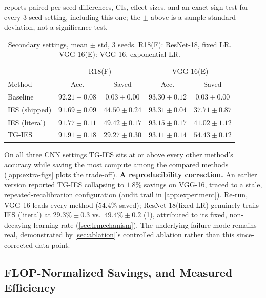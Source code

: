 \documentclass{article}
\newcommand{\win}[1]{\cellcolor{tgwin}#1}
\newcommand{\lose}[1]{\cellcolor{tglose}#1}
\theoremstyle{plain}
\theoremstyle{definition}
\theoremstyle{remark}
\begin{document}
 reports paired per-seed differences, CIs, effect sizes, and an exact sign test for every 3-seed setting, including this one; the $\pm$ above is a sample standard deviation, not a significance test.

\begin{table}[t]
\caption{Secondary settings, mean $\pm$ std, 3 seeds. R18(F): ResNet-18, fixed LR. VGG-16(E): VGG-16, exponential LR.}
\label{tab:secondary}
\centering
\small
\begin{tabular}{lcccc}
\toprule
& \multicolumn{2}{c}{R18(F)} & \multicolumn{2}{c}{VGG-16(E)} \\
Method & Acc. & Saved & Acc. & Saved \\
\midrule
Baseline & $92.21\pm0.08$ & $0.03\pm0.00$ & $93.30\pm0.12$ & $0.03\pm0.00$ \\
IES (shipped) & $91.69\pm0.09$ & $44.50\pm0.24$ & $93.31\pm0.04$ & $37.71\pm0.87$ \\
IES (literal) & $91.77\pm0.11$ & $\mathbf{49.42\pm0.17}$ & $93.15\pm0.17$ & $41.02\pm1.12$ \\
TG-IES & \lose{$91.91\pm0.18$} & \lose{$29.27\pm0.30$} & \lose{$93.11\pm0.14$} & \win{$\mathbf{54.43\pm0.12}$} \\
\bottomrule
\end{tabular}
\end{table}

On all three CNN settings TG-IES sits at or above every other method's accuracy while saving the most compute among the compared methods (\cref{app:extra-figs} plots the trade-off). \textbf{A reproducibility correction.} An earlier version reported TG-IES collapsing to $1.8\%$ savings on VGG-16, traced to a stale, repeated-recalibration configuration (audit trail in \cref{app:experiment}). Re-run, VGG-16 leads every method ($54.4\%$ saved); ResNet-18(fixed-LR) genuinely trails IES (literal) at $29.3\%\pm0.3$ vs.\ $49.4\%\pm0.2$ (\cref{tab:secondary}), attributed to its fixed, non-decaying learning rate (\cref{sec:lrmechanism}). The underlying failure mode remains real, demonstrated by \cref{sec:ablation}'s controlled ablation rather than this since-corrected data point.

\subsection{FLOP-Normalized Savings, and Measured Efficiency}
\label{sec:flops}
\end{document}
